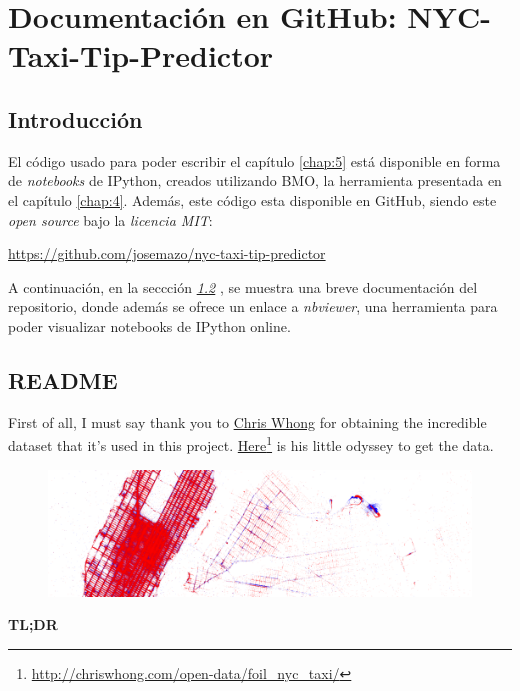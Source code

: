\chapter{Documentación en GitHub: NYC-Taxi-Tip-Predictor} \label{chap:ap_b}

\vspace*{5mm}

\section{Introducción} \label{sec:b.1}

El código usado para poder escribir el capítulo \ref{chap:5} está disponible en forma de \emph{notebooks} de IPython, creados utilizando BMO, la herramienta presentada en el capítulo \ref{chap:4}. Además, este código esta disponible en GitHub, siendo este \emph{open source} bajo la \emph{licencia MIT}:

\url{https://github.com/josemazo/nyc-taxi-tip-predictor}

A continuación, en la seccción \emph{\ref{sec:b.2} }, se muestra una breve documentación del repositorio, donde además se ofrece un enlace a \emph{nbviewer}, una herramienta para poder visualizar notebooks de IPython online.

\section{README} \label{sec:b.2}

First of all, I must say thank you to \href{https://twitter.com/chris_whong}{Chris Whong} for obtaining the incredible dataset that it's used in this project. \href{http://chriswhong.com/open-data/foil_nyc_taxi/}{Here}\footnote{\url{http://chriswhong.com/open-data/foil_nyc_taxi/}} is his little odyssey to get the data.

\begin{figure}[H]
  \centering
  \includegraphics[width=140mm]{figures/ap_b/map.png}
  \label{fig:b.1}
\end{figure}

\Large
\textbf{TL;DR}

